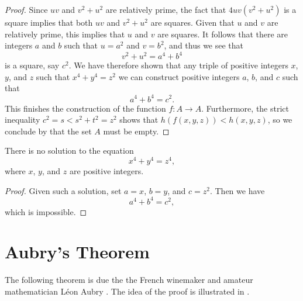 \begin{proof}
  Since $uv$ and $v^2+u^2$ are relatively prime, the fact that $4uv(v^2+u^2)$ is a square implies that both $uv$ and $v^2+u^2$ are squares. Given that $u$ and $v$ are relatively prime, this implies that $u$ and $v$ are squares. It follows that there are integers $a$ and $b$ such that $u=a^2$ and $v=b^2$, and thus we see that
  \begin{equation*}
    v^2+u^2=a^4+b^4
  \end{equation*}
  is a square, say $c^2$. We have therefore shown that any triple of positive integers $x$, $y$, and $z$ such that $x^4+y^4=z^2$ we can construct positive integers $a$, $b$, and $c$ such that
  \begin{equation*}
    a^4 + b^4 = c^2.
  \end{equation*}
  This finishes the construction of the function $f:A\to A$. Furthermore, the strict inequality $c^2=s<s^2+t^2=z^2$ shows that $h(f(x,y,z))<h(x,y,z)$, so we conclude by  that the set $A$ must be empty.
\end{proof}

\begin{corollary}
  There is no solution to the equation
  \begin{equation*}
    x^{4}+y^{4}=z^{4},
  \end{equation*}
  where $x$, $y$, and $z$ are positive integers.
\end{corollary}

\begin{proof}
  Given such a solution, set $a=x$, $b=y$, and $c=z^{2}$. Then we have
  \begin{equation*}
    a^4+b^4=c^2,
  \end{equation*}
  which is impossible.
\end{proof}

\section{Aubry's Theorem}

The following theorem is due the the French winemaker and amateur mathematician L\'eon Aubry \cite{Aubry1912}. The idea of the proof is illustrated in .

